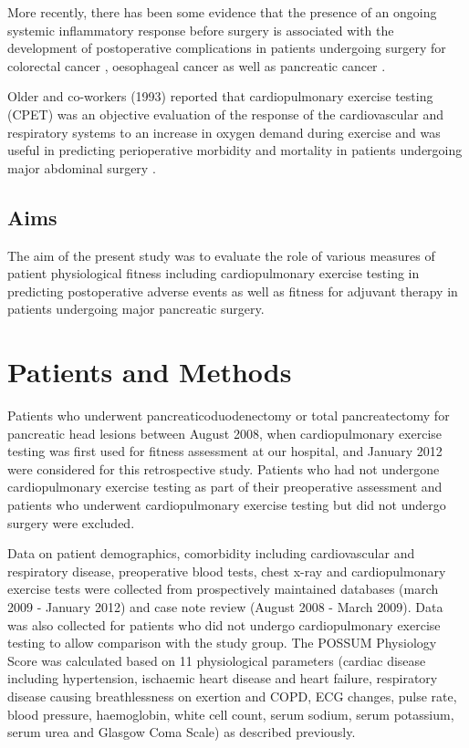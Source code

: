 More recently, there has been some evidence that the presence of an ongoing systemic inflammatory response before surgery is associated with the development of postoperative complications in patients undergoing surgery for colorectal cancer \parencite{moyes_preoperative_2009}, oesophageal cancer \parencite{vashist_glasgow_2010} as well as pancreatic cancer \parencite{knight_evaluation_2010}.

Older and co-workers (1993) reported that cardiopulmonary exercise testing (CPET) was an objective evaluation of the response of the cardiovascular and respiratory systems to an increase in oxygen demand during exercise and was useful in predicting perioperative morbidity and mortality in patients undergoing major abdominal surgery \parencite{older_preoperative_1993}.

\subsection{Aims}
The aim of the present study was to evaluate the role of various measures of patient physiological fitness including cardiopulmonary exercise testing in predicting postoperative adverse events as well as fitness for adjuvant therapy in patients undergoing major pancreatic surgery.

\clearpage

\section{Patients and Methods}
Patients who underwent pancreaticoduodenectomy or total pancreatectomy for pancreatic head lesions between August 2008, when cardiopulmonary exercise testing was first used for fitness assessment at our hospital, and January 2012 were considered for this retrospective study. 
Patients who had not undergone cardiopulmonary exercise testing as part of their preoperative assessment and patients who underwent cardiopulmonary exercise testing but did not undergo surgery were excluded. 

Data on patient demographics, comorbidity including cardiovascular and respiratory disease, preoperative blood tests, chest x-ray and cardiopulmonary exercise tests were collected from prospectively maintained databases (march 2009 - January 2012) and case note review (August 2008 - March 2009). 
Data was also collected for patients who did not undergo cardiopulmonary exercise testing to allow comparison with the study group. 
The POSSUM Physiology Score was calculated based on 11 physiological parameters (cardiac disease including hypertension, ischaemic heart disease and heart failure, respiratory disease causing breathlessness on exertion and COPD, ECG changes, pulse rate, blood pressure, haemoglobin, white cell count, serum sodium, serum potassium, serum urea and Glasgow Coma Scale) as described previously.

